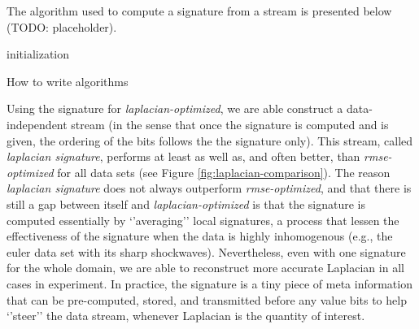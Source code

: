 The algorithm used to compute a signature from a stream is presented below (TODO: placeholder).
\begin{algorithm}
  initialization\;
  \caption{How to write algorithms}
 \end{algorithm}

Using the signature for \emph{laplacian-optimized}, we are able construct a data-independent stream
(in the sense that once the signature is computed and is given, the ordering of the bits follows the
the signature only). This stream, called \emph{laplacian signature}, performs at least as well as,
and often better, than \emph{rmse-optimized} for all data sets (see Figure
\ref{fig:laplacian-comparison}). The reason \emph{laplacian signature} does not always outperform
\emph{rmse-optimized}, and that there is still a gap between itself and \emph{laplacian-optimized}
is that the signature is computed essentially by `'averaging'' local signatures, a process that
lessen the effectiveness of the signature when the data is highly inhomogenous (e.g., the euler data
set with its sharp shockwaves). Nevertheless, even with one signature for the whole domain, we are
able to reconstruct more accurate Laplacian in all cases in experiment. In practice, the signature
is a tiny piece of meta information that can be pre-computed, stored, and transmitted before any
value bits to help `'steer'' the data stream, whenever Laplacian is the quantity of interest.
